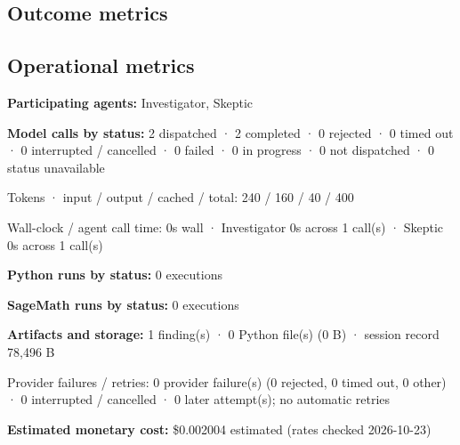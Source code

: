 \documentclass[11pt]{article}
\begin{document}
\subsection{Outcome metrics}
\subsection{Operational metrics}
\textbf{Participating agents:} Investigator, Skeptic\par
\textbf{Model calls by status:} 2 dispatched · 2 completed · 0 rejected · 0 timed out · 0 interrupted / cancelled · 0 failed · 0 in progress · 0 not dispatched · 0 status unavailable\par
Tokens · input / output / cached / total: 240 / 160 / 40 / 400\par
Wall-clock / agent call time: 0s wall · Investigator 0s across 1 call(s) · Skeptic 0s across 1 call(s)\par
\textbf{Python runs by status:} 0 executions\par
\textbf{SageMath runs by status:} 0 executions\par
\textbf{Artifacts and storage:} 1 finding(s) · 0 Python file(s) (0 B) · session record 78,496 B\par
Provider failures / retries: 0 provider failure(s) (0 rejected, 0 timed out, 0 other) · 0 interrupted / cancelled · 0 later attempt(s); no automatic retries\par
\textbf{Estimated monetary cost:} \$0.002004 estimated (rates checked 2026-10-23)\par
\end{document}
